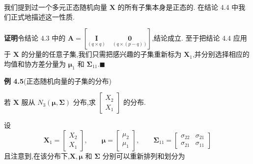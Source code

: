 我们提到过一个多元正态随机向量 $\mathbf{X}$ 的所有子集本身是正态的. 在结论 4.4 中我们正式地描述这一性质.


\noindent\textbf{证明}\quad 令结论 4.3 中的 $\mathbf{A}=\left[\underset{(q\times q)}{\mathbf{I}}\quad\underset{(q\times(p-q))}{\mathbf{0}}\right]$,结论成立. 至于把结论 4.4 应用于 $\mathbf{X}$ 的分量的任意子集,我们只需把感兴趣的子集重新标为 $\mathbf{X}_1$,并分别选择相应的均值和协方差分量为 $\boldsymbol{\mu}_1$ 和 $\boldsymbol{\Sigma}_{11}$.\hfill$\blacksquare$

\noindent\textbf{例 4.5}\quad (正态随机向量的子集的分布)

若 $\mathbf{X}$ 服从 $N_3(\boldsymbol{\mu},\boldsymbol{\Sigma})$ 分布,求 $\begin{bmatrix}X_2\\X_1\end{bmatrix}$ 的分布.

设
\[
\mathbf{X}_1=\begin{bmatrix}X_2\\X_1\end{bmatrix},\qquad \boldsymbol{\mu}=\begin{bmatrix}\mu_2\\\mu_1\end{bmatrix},\qquad \boldsymbol{\Sigma}_{11}=\begin{bmatrix}\sigma_{22}&\sigma_{21}\\\sigma_{21}&\sigma_{11}\end{bmatrix}
\]
且注意到,在该分布下,$\mathbf{X},\boldsymbol{\mu}$ 和 $\boldsymbol{\Sigma}$ 分别可以重新排列和划分为
